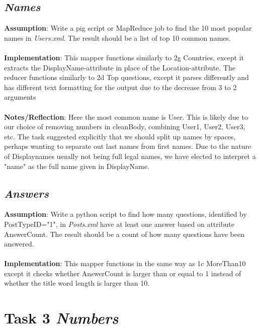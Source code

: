\documentclass[fleqn,10pt]{wlscirep}
\begin{document}
\subsection{\emph{Names}}
\textbf{Assumption}: Write a pig script or MapReduce job to find the 10 most popular names in \textit{Users.xml}. The result should be a list of top 10 common names. \\ \\
\textbf{Implementation}: This mapper functions similarly to 2g Countries, except it extracts the DisplayName-attribute in place of the Location-attribute. The reducer functions similarly to 2d Top questions, except it parses differently and has different text formatting for the output due to the decrease from 3 to 2 arguments \\ \\
\textbf{Notes/Reflection}: Here the most common name is User. This is likely due to our choice of removing numbers in cleanBody, combining User1, User2, User3, etc. The task suggested explicitly that we should split up names by spaces, perhaps wanting to separate out last names from first names. Due to the nature of Displaynames usually not being full legal names, we have elected to interpret a "name" as the full name given in DisplayName.



\subsection{\emph{Answers}}
\textbf{Assumption}: Write a python script to find how many questions, identified by PostTypeID="1", in \textit{Posts.xml} have at least one answer based on attribute AnswerCount. The result should be a count of how many questions have been answered. \\ \\
\textbf{Implementation}: This mapper functions in the same way as 1c MoreThan10 except it checks whether AnswerCount is larger than or equal to 1 instead of whether the title word length is larger than 10.


\section{Task 3 \emph{Numbers}}
\end{document}
